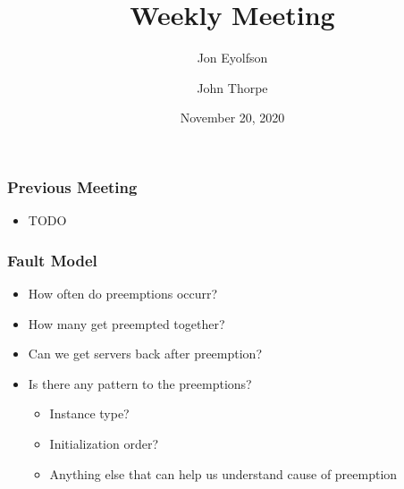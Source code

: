 
\title{Weekly Meeting}
\date{November 20, 2020}
\author{Jon Eyolfson \and John Thorpe}



  \begin{frame}[plain]
    \titlepage
  \end{frame}

  \setcounter{framenumber}{0}

  \begin{frame}
    \frametitle{Previous Meeting}

    \begin{itemize}
      \item TODO
    \end{itemize}
  \end{frame}

  \begin{frame}
    \frametitle{Fault Model}
      \begin{itemize}
        \item How often do preemptions occurr?
        \item How many get preempted together?
        \item Can we get servers back after preemption?
        \item Is there any pattern to the preemptions?
        \begin{itemize}
          \item Instance type?
          \item Initialization order?
          \item Anything else that can help us understand cause of preemption
        \end{itemize}

      \end{itemize}
  \end{frame}


